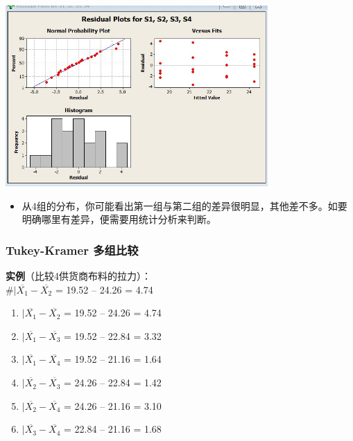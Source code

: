 
\includegraphics[width=10cm]{Anova3inOneScreenshot_2022-08-07_125131.jpg}

\begin{itemize}
\tightlist
\item
  从4组的分布，你可能看出第一组与第二组的差异很明显，其他差不多。如要明确哪里有差异，便需要用统计分析来判断。
\end{itemize}

\hypertarget{tukey-kramer-ux591aux7ec4ux6bd4ux8f83}{%
\subsubsection{Tukey-Kramer
多组比较}\label{tukey-kramer-ux591aux7ec4ux6bd4ux8f83}}

\textbf{实例}（比较4供货商布料的拉力）：\\
\#\(|\overline{X_1} - \overline{X_2}\) = \textbar{}19.52 --
24.26\textbar{} = 4.74

\begin{enumerate}
\tightlist
\item
  \(|\overline{X_1} - \overline{X_2}\) = \textbar{}19.52 --
  24.26\textbar{} = 4.74
\item
  \(|\overline{X_1} - \overline{X_3}\) = \textbar{}19.52 --
  22.84\textbar{} = 3.32
\item
  \(|\overline{X_1} - \overline{X_4}\) = \textbar{}19.52 --
  21.16\textbar{} = 1.64
\item
  \(|\overline{X_2} - \overline{X_3}\) = \textbar{}24.26 --
  22.84\textbar{} = 1.42
\item
  \(|\overline{X_2} - \overline{X_4}\) = \textbar{}24.26 --
  21.16\textbar{} = 3.10
\item
  \(|\overline{X_3} - \overline{X_4}\) = \textbar{}22.84 --
  21.16\textbar{} = 1.68
\end{enumerate}

